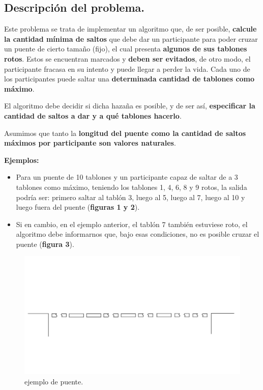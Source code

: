 \subsection{Descripción del problema.}

\vspace*{0.3cm}

Este problema se trata de implementar un algoritmo que, de ser posible,
\textbf{calcule la cantidad mínima de saltos} que debe dar un participante para poder cruzar un
puente de cierto tamaño (fijo), el cual presenta \textbf{algunos de sus tablones rotos}. Estos se encuentran
marcados y \textbf{deben ser evitados}, de otro modo, el participante fracasa en su intento y puede llegar a
perder la vida. Cada uno de los participantes puede saltar una \textbf{determinada cantidad de tablones como máximo}. \medskip

El algoritmo debe decidir si dicha hazaña es posible, y de ser así,
\textbf{especificar la cantidad de saltos a dar y a qué tablones hacerlo}. \medskip

Asumimos que tanto la \textbf{longitud del puente como la cantidad de saltos máximos por participante
son valores naturales}.

\vspace*{0.5cm}

\textbf{Ejemplos:}
\begin{itemize}
  \item Para un puente de 10 tablones y un participante capaz de saltar de a 3
  tablones como máximo, teniendo los tablones 1, 4, 6, 8 y 9 rotos, la salida podría ser:
  primero saltar al tablón 3, luego al 5, luego al 7, luego al 10 y luego fuera del puente
  (\textbf{figuras 1 y 2}).

  \item Si en cambio, en el ejemplo anterior, el tablón 7 también estuviese roto,
  el algoritmo debe informarnos que, bajo esas condiciones, no es posible cruzar el puente
  (\textbf{figura 3}).
\end{itemize}


\begin{figure}[htb]
  \begin{center}
      \includegraphics[scale=0.25]{imagenes/ej1-puente.jpg}
  \end{center}
  \caption{ejemplo de puente.}
\end{figure}


